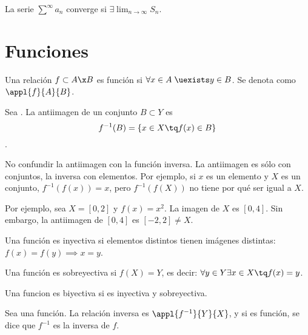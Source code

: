 \documentclass[palatino, nochap]{apuntes}
\begin{document}
\begin{lemma}La serie $\sum^{\infty}a_n$ converge si $\exists\lim_{n\to\infty}S_n$.\end{lemma}

\section{Funciones}

\begin{defn}[Función]
Una relación $f\subset A\x B$ es función si $\forall x \in A \; \uexists y \in B$. Se denota como $\appl{f}{A}{B}$.
\end{defn}

\begin{defn}[Antiimagen]
Sea \stdf. La antiimagen de un conjunto $B\subset Y$ es
\[ f^{-1}(B)=\{ x\in X \tq f(x) \in B\}\].
\end{defn}

\begin{remark}No confundir la antiimagen con la función inversa. La antiimagen es sólo con conjuntos, la inversa con elementos. Por ejemplo, si $x$ es un elemento y $X$ es un conjunto, $f^{-1}(f(x))=x$, pero $f^{-1}(f(X))$ no tiene por qué ser igual a $X$.

Por ejemplo, sea $X=[0,2]$ y $f(x)=x^2$. La imagen de $X$ es $[0,4]$. Sin embargo, la antiimagen de $[0,4]$ es $[-2,2]\neq X$.
\end{remark}

\begin{defn} Una función \stdf es inyectiva si elementos distintos tienen imágenes distintas: $f(x)=f(y) \implies x=y$.
\end{defn}

\begin{defn}
Una función \stdf es sobreyectiva si $f(X)=Y$, es decir: $\forall y \in Y \exists x \in X \tq f(x)=y$.
\end{defn}

\begin{defn}
Una funcion es biyectiva si es inyectiva y sobreyectiva.
\end{defn}

\begin{defn} Sea \stdf una función. La relación inversa es $\appl{f^{-1}}{Y}{X}$, y si es función, se dice que $f^{-1}$ es la inversa de $f$.
\end{defn}
\end{document}
